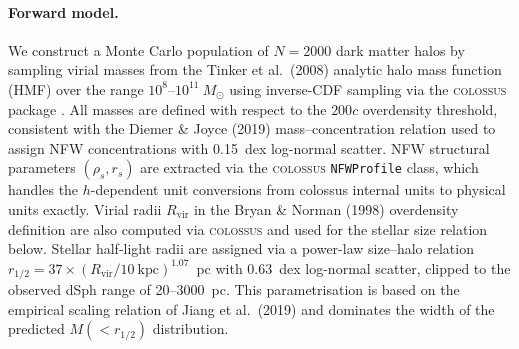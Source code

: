 \paragraph{Forward model.}
We construct a Monte Carlo population of $N = 2000$ dark matter halos by sampling
virial masses from the Tinker et al.\ (2008) analytic halo mass function (HMF) over the
range $10^8$--$10^{11}~M_\odot$ using inverse-CDF sampling via the \textsc{colossus}
package \citep{Diemer2018}.
All masses are defined with respect to the $200c$ overdensity threshold, consistent with
the Diemer \& Joyce (2019) mass--concentration relation used to assign NFW concentrations
with 0.15~dex log-normal scatter.
NFW structural parameters $(\rho_s, r_s)$ are extracted via the \textsc{colossus}
\texttt{NFWProfile} class, which handles the $h$-dependent unit conversions from
colossus internal units to physical units exactly.
Virial radii $R_\mathrm{vir}$ in the Bryan \& Norman (1998) overdensity definition are
also computed via \textsc{colossus} and used for the stellar size relation below.
Stellar half-light radii are assigned via a power-law size--halo relation
$r_{1/2} = 37 \times (R_\mathrm{vir}/10~\mathrm{kpc})^{1.07}$~pc with 0.63~dex
log-normal scatter, clipped to the observed dSph range of 20--3000~pc.
This parametrisation is based on the empirical scaling relation of
Jiang et al.\ (2019) and dominates the width of the predicted $M(<r_{1/2})$
distribution.


